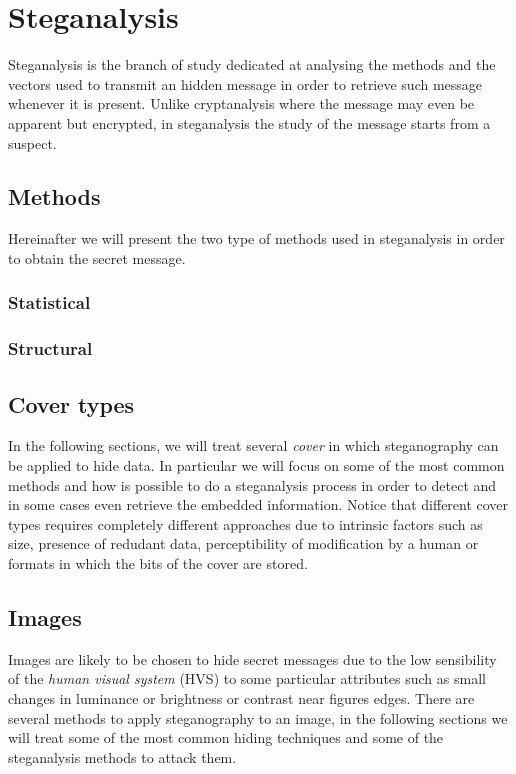 \documentclass[../../main.tex]{subfiles}
\begin{document}
    
    \section{Steganalysis}
    Steganalysis is the branch of study dedicated at analysing the methods and
    the vectors used to transmit an hidden message in order to retrieve such
    message whenever it is present.
    Unlike cryptanalysis where the message may even be apparent but encrypted,
    in steganalysis the study of the message starts from a suspect.
    \subsection{Methods}
    Hereinafter we will present the two type of methods used in steganalysis in
    order to obtain the secret message.

    \subsubsection{Statistical}

    \subsubsection{Structural}

    \subsection{Cover types}
    In the following sections, we will treat several \emph{cover} in which
    steganography can be applied to hide data.
    In particular we will focus on some of the most common methods and how is
    possible to do a steganalysis process in order to detect and in some cases
    even retrieve the embedded information.
    Notice that different cover types requires completely different approaches
    due to intrinsic factors such as size, presence of redudant data,
    perceptibility of modification by a human or formats in which the bits of
    the cover are stored.


    \subsection{Images}
    Images are likely to be chosen to hide secret messages due to the low
    sensibility of the \emph{human visual system} (HVS) to some particular
    attributes such as small changes in luminance or brightness or contrast near
    figures edges.
    There are several methods to apply steganography to an image, in the
    following sections we will treat some of the most common hiding techniques
    and some of the steganalysis methods to attack them.
\end{document}
